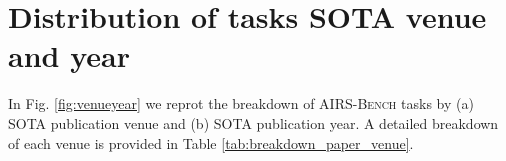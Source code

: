 \documentclass{fairmeta}
\newcommand{\airsbench}{\textsc{AIRS-Bench}}
\begin{document}

\section{Distribution of tasks SOTA venue and year}
\label{app:task_paper_info}

In Fig. \ref{fig:venueyear} we reprot the breakdown of \airsbench{} tasks by (a) SOTA publication venue and (b) SOTA publication year. A detailed breakdown of each venue is provided in Table \ref{tab:breakdown_paper_venue}.
\end{document}
